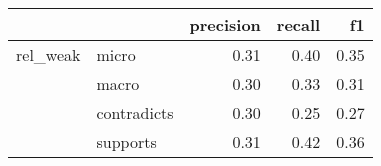 \begin{tabular}{llrrr}
\toprule
         &          &  precision &  recall &   f1 \\
\midrule
rel\_weak & micro &       0.31 &    0.40 & 0.35 \\
         & macro &       0.30 &    0.33 & 0.31 \\
         & contradicts &       0.30 &    0.25 & 0.27 \\
         & supports &       0.31 &    0.42 & 0.36 \\
\bottomrule
\end{tabular}
